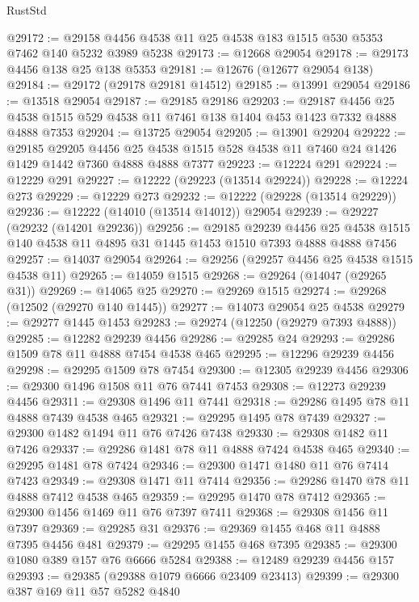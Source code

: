 \begin{lexlean}{RustStd}
\begin{coremodule}
@29172 := @29158 @4456 @4538 @11 @25 @4538 @183 @1515 @530 @5353 @7462 @140 @5232 @3989 @5238
@29173 := @12668 @29054
@29178 := @29173 @4456 @138 @25 @138 @5353
@29181 := @12676 (@12677 @29054 @138)
@29184 := @29172 (@29178 @29181 @14512)
@29185 := @13991 @29054
@29186 := @13518 @29054
@29187 := @29185 @29186
@29203 := @29187
    @4456
    @25
    @4538
    @1515
    @529
    @4538
    @11
    @7461
    @138
    @1404
    @453
    @1423
    @7332
    @4888
    @4888
    @7353
@29204 := @13725 @29054
@29205 := @13901 @29204
@29222 := @29185
    @29205
    @4456
    @25
    @4538
    @1515
    @528
    @4538
    @11
    @7460
    @24
    @1426
    @1429
    @1442
    @7360
    @4888
    @4888
    @7377
@29223 := @12224 @291
@29224 := @12229 @291
@29227 := @12222 (@29223 (@13514 @29224))
@29228 := @12224 @273
@29229 := @12229 @273
@29232 := @12222 (@29228 (@13514 @29229))
@29236 := @12222 (@14010 (@13514 @14012)) @29054
@29239 := @29227 (@29232 (@14201 @29236))
@29256 := @29185
    @29239
    @4456
    @25
    @4538
    @1515
    @140
    @4538
    @11
    @4895
    @31
    @1445
    @1453
    @1510
    @7393
    @4888
    @4888
    @7456
@29257 := @14037 @29054
@29264 := @29256 (@29257 @4456 @25 @4538 @1515 @4538 @11)
@29265 := @14059 @1515
@29268 := @29264 (@14047 (@29265 @31))
@29269 := @14065 @25
@29270 := @29269 @1515
@29274 := @29268 (@12502 (@29270 @140 @1445))
@29277 := @14073 @29054 @25 @4538
@29279 := @29277 @1445 @1453
@29283 := @29274 (@12250 (@29279 @7393 @4888))
@29285 := @12282 @29239 @4456
@29286 := @29285 @24
@29293 := @29286 @1509 @78 @11 @4888 @7454 @4538 @465
@29295 := @12296 @29239 @4456
@29298 := @29295 @1509 @78 @7454
@29300 := @12305 @29239 @4456
@29306 := @29300 @1496 @1508 @11 @76 @7441 @7453
@29308 := @12273 @29239 @4456
@29311 := @29308 @1496 @11 @7441
@29318 := @29286 @1495 @78 @11 @4888 @7439 @4538 @465
@29321 := @29295 @1495 @78 @7439
@29327 := @29300 @1482 @1494 @11 @76 @7426 @7438
@29330 := @29308 @1482 @11 @7426
@29337 := @29286 @1481 @78 @11 @4888 @7424 @4538 @465
@29340 := @29295 @1481 @78 @7424
@29346 := @29300 @1471 @1480 @11 @76 @7414 @7423
@29349 := @29308 @1471 @11 @7414
@29356 := @29286 @1470 @78 @11 @4888 @7412 @4538 @465
@29359 := @29295 @1470 @78 @7412
@29365 := @29300 @1456 @1469 @11 @76 @7397 @7411
@29368 := @29308 @1456 @11 @7397
@29369 := @29285 @31
@29376 := @29369 @1455 @468 @11 @4888 @7395 @4456 @481
@29379 := @29295 @1455 @468 @7395
@29385 := @29300 @1080 @389 @157 @76 @6666 @5284
@29388 := @12489 @29239 @4456 @157
@29393 := @29385 (@29388 @1079 @6666 @23409 @23413)
@29399 := @29300 @387 @169 @11 @57 @5282 @4840

\end{coremodule}
\end{lexlean}

